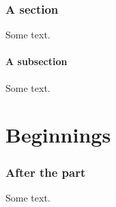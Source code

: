 \documentclass{article}
\begin{document}
\tableofcontents
\section{A section}
Some text.
\subsection{A subsection}
Some text.
\part{Beginnings}
\section{After the part}
Some text.
\end{document}
